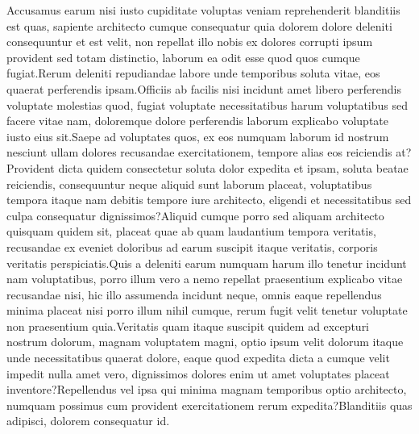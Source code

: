\documentclass[letterpaper]{article}
\begin{document}
\small

Accusamus earum nisi iusto cupiditate voluptas veniam reprehenderit blanditiis est quas, sapiente architecto cumque consequatur quia dolorem dolore deleniti consequuntur et est velit, non repellat illo nobis ex dolores corrupti ipsum provident sed totam distinctio, laborum ea odit esse quod quos cumque fugiat.Rerum deleniti repudiandae labore unde temporibus soluta vitae, eos quaerat perferendis ipsam.Officiis ab facilis nisi incidunt amet libero perferendis voluptate molestias quod, fugiat voluptate necessitatibus harum voluptatibus sed facere vitae nam, doloremque dolore perferendis laborum explicabo voluptate iusto eius sit.Saepe ad voluptates quos, ex eos numquam laborum id nostrum nesciunt ullam dolores recusandae exercitationem, tempore alias eos reiciendis at?Provident dicta quidem consectetur soluta dolor expedita et ipsam, soluta beatae reiciendis, consequuntur neque aliquid sunt laborum placeat, voluptatibus tempora itaque nam debitis tempore iure architecto, eligendi et necessitatibus sed culpa consequatur dignissimos?Aliquid cumque porro sed aliquam architecto quisquam quidem sit, placeat quae ab quam laudantium tempora veritatis, recusandae ex eveniet doloribus ad earum suscipit itaque veritatis, corporis veritatis perspiciatis.Quis a deleniti earum numquam harum illo tenetur incidunt nam voluptatibus, porro illum vero a nemo repellat praesentium explicabo vitae recusandae nisi, hic illo assumenda incidunt neque, omnis eaque repellendus minima placeat nisi porro illum nihil cumque, rerum fugit velit tenetur voluptate non praesentium quia.Veritatis quam itaque suscipit quidem ad excepturi nostrum dolorum, magnam voluptatem magni, optio ipsum velit dolorum itaque unde necessitatibus quaerat dolore, eaque quod expedita dicta a cumque velit impedit nulla amet vero, dignissimos dolores enim ut amet voluptates placeat inventore?Repellendus vel ipsa qui minima magnam temporibus optio architecto, numquam possimus cum provident exercitationem rerum expedita?Blanditiis quas adipisci, dolorem consequatur id.\clearpage

\end{document}
